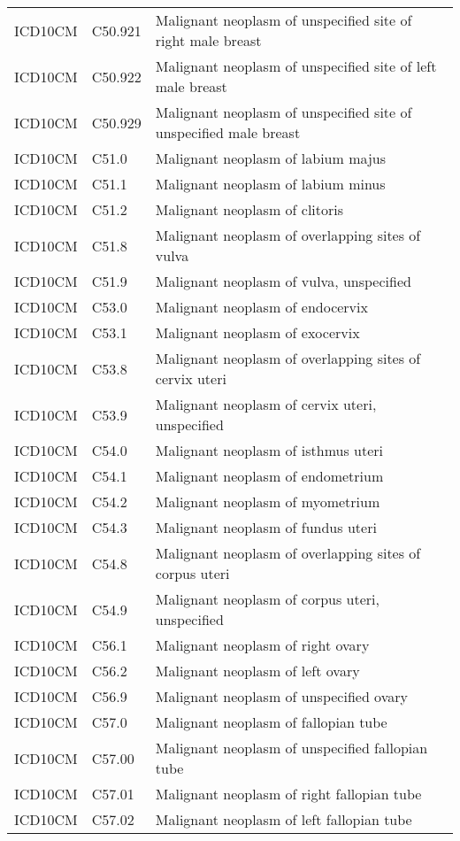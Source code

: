 \begin{longtable}{p{}p{}p{}}
  ICD10CM & C50.921 & Malignant neoplasm of unspecified site of right male breast \\ 
  ICD10CM & C50.922 & Malignant neoplasm of unspecified site of left male breast \\ 
  ICD10CM & C50.929 & Malignant neoplasm of unspecified site of unspecified male breast \\ 
  ICD10CM & C51.0 & Malignant neoplasm of labium majus \\ 
  ICD10CM & C51.1 & Malignant neoplasm of labium minus \\ 
  ICD10CM & C51.2 & Malignant neoplasm of clitoris \\ 
  ICD10CM & C51.8 & Malignant neoplasm of overlapping sites of vulva \\ 
  ICD10CM & C51.9 & Malignant neoplasm of vulva, unspecified \\ 
  ICD10CM & C53.0 & Malignant neoplasm of endocervix \\ 
  ICD10CM & C53.1 & Malignant neoplasm of exocervix \\ 
  ICD10CM & C53.8 & Malignant neoplasm of overlapping sites of cervix uteri \\ 
  ICD10CM & C53.9 & Malignant neoplasm of cervix uteri, unspecified \\ 
  ICD10CM & C54.0 & Malignant neoplasm of isthmus uteri \\ 
  ICD10CM & C54.1 & Malignant neoplasm of endometrium \\ 
  ICD10CM & C54.2 & Malignant neoplasm of myometrium \\ 
  ICD10CM & C54.3 & Malignant neoplasm of fundus uteri \\ 
  ICD10CM & C54.8 & Malignant neoplasm of overlapping sites of corpus uteri \\ 
  ICD10CM & C54.9 & Malignant neoplasm of corpus uteri, unspecified \\ 
  ICD10CM & C56.1 & Malignant neoplasm of right ovary \\ 
  ICD10CM & C56.2 & Malignant neoplasm of left ovary \\ 
  ICD10CM & C56.9 & Malignant neoplasm of unspecified ovary \\ 
  ICD10CM & C57.0 & Malignant neoplasm of fallopian tube \\ 
  ICD10CM & C57.00 & Malignant neoplasm of unspecified fallopian tube \\ 
  ICD10CM & C57.01 & Malignant neoplasm of right fallopian tube \\ 
  ICD10CM & C57.02 & Malignant neoplasm of left fallopian tube \\ 

\end{longtable}
